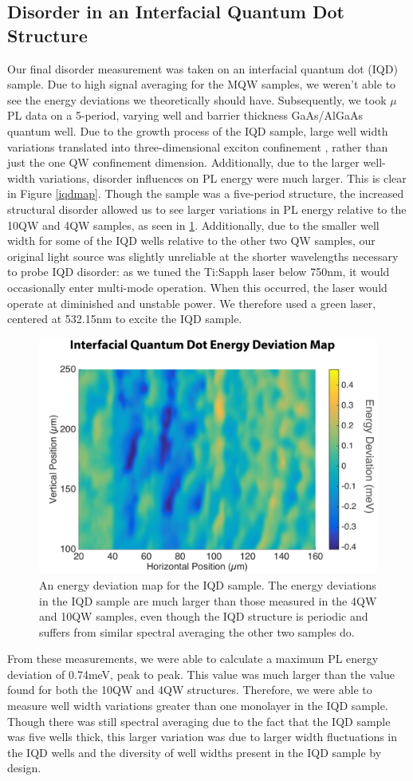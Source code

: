\subsection{Disorder in an Interfacial Quantum Dot Structure}
\indent Our final disorder measurement was taken on an interfacial quantum dot (IQD) sample. Due to high signal averaging for the MQW samples, we weren't able to see the energy deviations we theoretically should have. Subsequently, we took $\mu$PL data on a 5-period, varying well and barrier thickness GaAs/AlGaAs quantum well. Due to the growth process of the IQD sample, large well width variations translated into three-dimensional exciton confinement \cite{galanthesis, fox}, rather than just the one QW confinement dimension. Additionally, due to the larger well-width variations, disorder influences on PL energy were much larger. This is clear in Figure \ref{iqdmap}. Though the sample was a five-period structure, the increased structural disorder allowed us to see larger variations in PL energy relative to the 10QW and 4QW samples, as seen in \ref{iqdDev}. Additionally, due to the smaller well width for some of the IQD wells relative to the other two QW samples, our original light source was slightly unreliable at the shorter wavelengths necessary to probe IQD disorder: as we tuned the Ti:Sapph laser below 750nm, it would occasionally enter multi-mode operation. When this occurred, the laser would operate at diminished and unstable power. We therefore used a green laser, centered at 532.15nm to excite the IQD sample.


\begin{figure}
\centering
\includegraphics[width = .8\textwidth]{iqd.png}
\caption{ \doublespacing An energy deviation map for the IQD sample. The energy deviations in the IQD sample are much larger than those measured in the 4QW and 10QW samples, even though the IQD structure is periodic and suffers from similar spectral averaging the other two samples do.}
\label{iqdDev}
\end{figure}
\indent From these measurements, we were able to calculate a maximum PL energy deviation of 0.74meV, peak to peak. This value was much larger than the value found for both the 10QW and 4QW structures. Therefore, we were able to measure well width variations greater than one monolayer in the IQD sample. Though there was still spectral averaging due to the fact that the IQD sample was five wells thick, this larger variation was due to larger width fluctuations in the IQD wells and the diversity of well widths present in the IQD sample by design.


